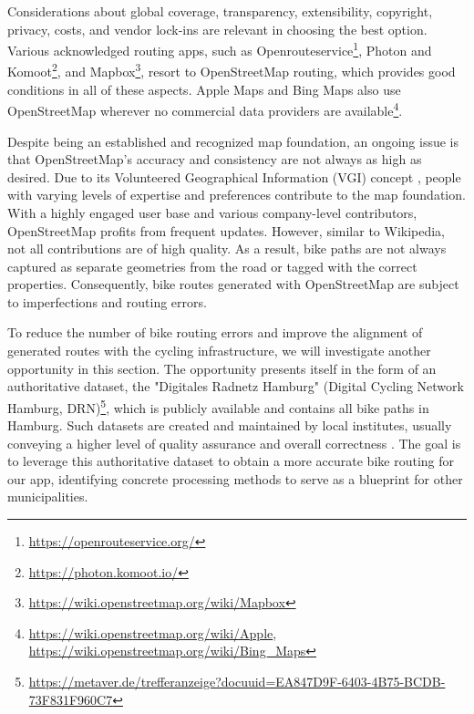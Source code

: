 Considerations about global coverage, transparency, extensibility, copyright, privacy, costs, and vendor lock-ins are relevant in choosing the best option. Various acknowledged routing apps, such as Openrouteservice\footnote{\url{https://openrouteservice.org/}}, Photon and Komoot\footnote{\url{https://photon.komoot.io/}}, and Mapbox\footnote{\url{https://wiki.openstreetmap.org/wiki/Mapbox}}, resort to OpenStreetMap routing, which provides good conditions in all of these aspects. Apple Maps and Bing Maps also use OpenStreetMap wherever no commercial data providers are available\footnote{\url{https://wiki.openstreetmap.org/wiki/Apple}, \url{https://wiki.openstreetmap.org/wiki/Bing_Maps}}. 

Despite being an established and recognized map foundation, an ongoing issue is that Open\allowbreak Street\allowbreak Map's accuracy and consistency are not always as high as desired. Due to its Volunteered Geographical Information (VGI) concept \cite{wasserman_evaluating_2019, jacobs_openstreetmap_2020, vybornova_automated_2023}, people with varying levels of expertise and preferences contribute to the map foundation. With a highly engaged user base and various company-level contributors, OpenStreetMap profits from frequent updates. However, similar to Wikipedia, not all contributions are of high quality. As a result, bike paths are not always captured as separate geometries from the road or tagged with the correct properties. Consequently, bike routes generated with OpenStreetMap are subject to imperfections and routing errors.

To reduce the number of bike routing errors and improve the alignment of generated routes with the cycling infrastructure, we will investigate another opportunity in this section. The opportunity presents itself in the form of an authoritative dataset, the "Digitales Radnetz Hamburg" (Digital Cycling Network Hamburg, DRN)\footnote{\url{https://metaver.de/trefferanzeige?docuuid=EA847D9F-6403-4B75-BCDB-73F831F960C7}}, which is publicly available and contains all bike paths in Hamburg. Such datasets are created and maintained by local institutes, usually conveying a higher level of quality assurance and overall correctness \cite{brovelli_towards_2017}. The goal is to leverage this authoritative dataset to obtain a more accurate bike routing for our app, identifying concrete processing methods to serve as a blueprint for other municipalities.

